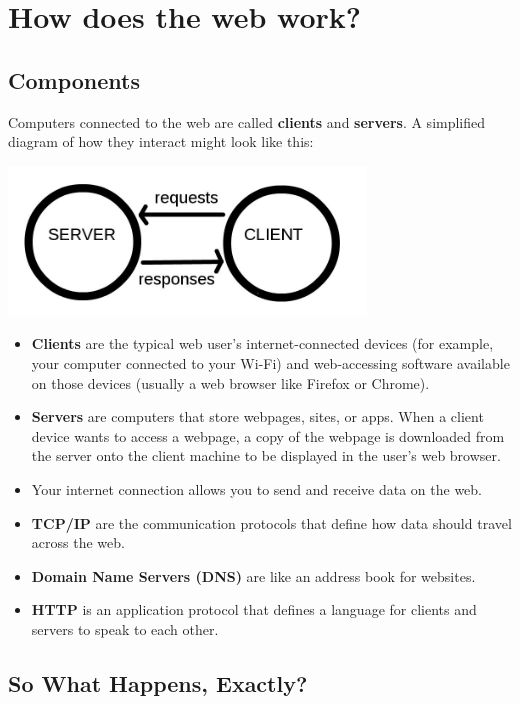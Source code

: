 \documentclass[]{book}
\providecommand{\tightlist}{%
  \setlength{\itemsep}{0pt}\setlength{\parskip}{0pt}}
\begin{document}
\hypertarget{how-does-the-web-work}{%
\section{How does the web work?}\label{how-does-the-web-work}}

\hypertarget{components}{%
\subsection{Components}\label{components}}

Computers connected to the web are called \textbf{clients} and \textbf{servers}. A simplified diagram of how they interact might look like this:

\includegraphics{Python/PythonWebScrape/images/client_server.png}

\begin{itemize}
\tightlist
\item
  \textbf{Clients} are the typical web user's internet-connected devices (for example, your computer connected to your Wi-Fi) and web-accessing software available on those devices (usually a web browser like Firefox or Chrome).
\item
  \textbf{Servers} are computers that store webpages, sites, or apps. When a client device wants to access a webpage, a copy of the webpage is downloaded from the server onto the client machine to be displayed in the user's web browser.
\item
  Your internet connection allows you to send and receive data on the web.
\item
  \textbf{TCP/IP} are the communication protocols that define how data should travel across the web.
\item
  \textbf{Domain Name Servers (DNS)} are like an address book for websites.
\item
  \textbf{HTTP} is an application protocol that defines a language for clients and servers to speak to each other.
\end{itemize}

\hypertarget{so-what-happens-exactly}{%
\subsection{So What Happens, Exactly?}\label{so-what-happens-exactly}}
\end{document}
